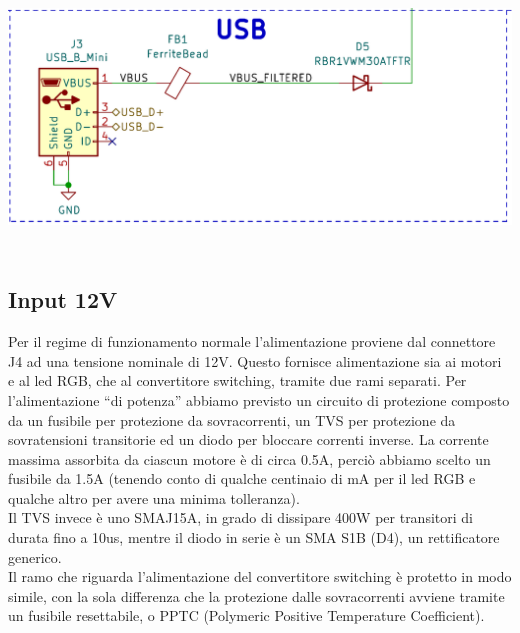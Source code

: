 \begin{center}
\includegraphics[width=6.5in,height=2.80556in]{figures/image60.png}
\captionsetup{type=figure}
\end{center}

\hypertarget{input-12V}{%
\subsection{\texorpdfstring{Input 12V}{Input 12V}}\label{input-12V}}

Per il regime di funzionamento normale l’alimentazione proviene dal connettore J4 ad una tensione nominale di 12V. 
Questo fornisce alimentazione sia ai motori e al led RGB, che al convertitore switching, tramite due rami separati.
Per l’alimentazione “di potenza” abbiamo previsto un circuito di protezione composto da un fusibile per protezione da sovracorrenti, 
un TVS per protezione da sovratensioni transitorie ed un diodo per bloccare correnti inverse. La corrente massima assorbita da 
ciascun motore è di circa 0.5A, perciò abbiamo scelto un fusibile da 1.5A (tenendo conto di qualche centinaio di mA per il led RGB 
e qualche altro per avere una minima tolleranza).\\
Il TVS invece è uno SMAJ15A, in grado di dissipare 400W per transitori di durata fino a 10us, mentre il diodo in serie è un SMA S1B 
(D4), un rettificatore generico.\\
Il ramo che riguarda l’alimentazione del convertitore switching è protetto in modo simile, con la sola differenza che la protezione 
dalle sovracorrenti avviene tramite un fusibile resettabile, o PPTC (Polymeric Positive Temperature Coefficient).

